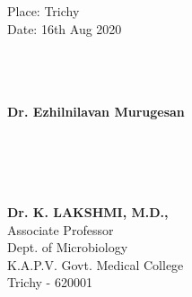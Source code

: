 \begin{singlespacing}
\hspace*{-0.25in}
\parbox{2.5in}{
	\noindent Place: Trichy \\ 
	\noindent Date: 16th Aug 2020 \\
	\\
	\\
	\\
}
\hspace*{1.0in}
\parbox{2.5in}{
	\noindent \textbf{Dr. Ezhilnilavan Murugesan}\\
	\\
	\\
	\\
	\\
}
\hspace*{2.25in}
\parbox{2.5in}{
	\noindent \textbf{Dr. K. LAKSHMI, M.D.,} \\
	\noindent Associate Professor \\ 
	\noindent Dept. of Microbiology \\
	\noindent K.A.P.V. Govt. Medical College\\
	\noindent Trichy - 620001 \\
}
\end{singlespacing}

 
